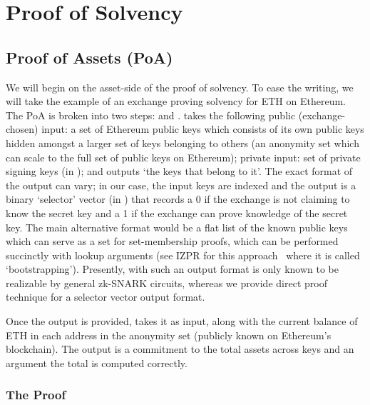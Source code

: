\chapter{Proof of Solvency}

\section{Proof of Assets (PoA)}

We will begin on the asset-side of the proof of solvency. To ease the writing, we will take the example of an exchange proving solvency for ETH on Ethereum. The PoA is broken into two steps: \bootstrap and \poa. \bootstrap takes the following public (exchange-chosen) input: a set of Ethereum public keys which consists of its own public keys hidden amongst a larger set of keys belonging to others (\ie an anonymity set which can scale to the full set of public keys on Ethereum); private input: set of private signing keys (in \secp); and outputs `the keys that belong to it'. The exact format of the output can vary; in our case, the input keys are indexed and the output is a binary `selector' vector (in \bls) that records a 0 if the exchange is not claiming to know the secret key and a 1 if the exchange can prove knowledge of the secret key. The main alternative format would be a flat list of the known public keys which can serve as a set for set-membership proofs, which can be performed succinctly with lookup arguments (see IZPR for this approach~\cite{izpr} where it is called `bootstrapping'). Presently, \bootstrap with such an output format is only known to be realizable by general zk-SNARK circuits, whereas we provide direct proof technique for a selector vector output format.

Once the \bootstrap output is provided, \poa takes it as input, along with the current balance of ETH in each address in the anonymity set (publicly known on Ethereum's blockchain). The output is a commitment to the total assets across keys and an argument the total is computed correctly. 


\subsection{The \bootstrap Proof}

